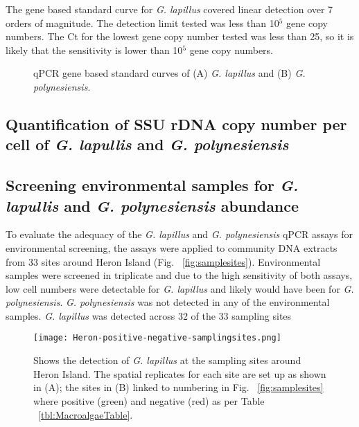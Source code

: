 \documentclass[12pt]{article}
\begin{document}
The gene based standard curve for \emph{G. lapillus} covered linear detection over 7 orders of magnitude. The detection limit tested was less than 10$^{5}$ gene copy numbers. The Ct for the lowest gene copy number tested was less than 25, so it is likely that the sensitivity is lower than 10$^{5}$ gene copy numbers.
\FloatBarrier
\begin{figure}
\caption{qPCR gene based standard curves of (A) \emph{G. lapillus} and (B) \emph{G. polynesiensis}.} %
\label{fig:lapigblocks}
\end{figure}
\FloatBarrier

\subsection{Quantification of SSU rDNA copy number per cell of \emph{G. lapullis} and \emph{G. polynesiensis}}

\subsection{Screening environmental samples for \emph{G. lapullis} and \emph{G. polynesiensis} abundance}
To evaluate the adequacy of the \emph{G. lapillus} and \emph{G. polynesiensis} qPCR assays for environmental screening, the assays were applied to community DNA extracts from 33 sites around Heron Island (Fig. ~\ref{fig:samplesites}). Environmental samples were screened in triplicate and due to the high sensitivity of both assays, low cell numbers were detectable for \emph{G. lapillus} and likely would have been for \emph{G. polynesiensis}.
\emph{G. polynesiensis} was not detected in any of the environmental samples.
\emph{G. lapillus} was detected across 32 of the 33 sampling sites

\FloatBarrier 
\begin{figure} 
\texttt{[image: Heron-positive-negative-samplingsites.png]} 
\caption{Shows the detection of \emph{G. lapillus} at the sampling sites around Heron Island. The spatial replicates for each site are set up as shown in (A); the sites in (B) linked to numbering in Fig. ~\ref{fig:samplesites} where positive (green) and negative (red) as per Table ~\ref{tbl:MacroalgaeTable}.} 
\label{fig:envposneg}
\end{figure} 
\FloatBarrier
\end{document}
